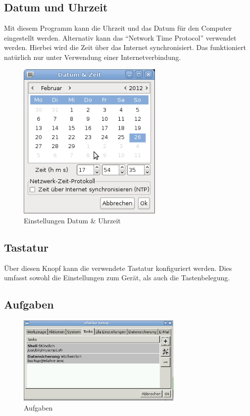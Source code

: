 \documentclass[a4paper,12pt,twoside]{article}
\begin{document}
\subsection{Datum und Uhrzeit}
\label{sct:datetime}
Mit diesem Programm kann die Uhrzeit und das Datum für den Computer
eingestellt werden. Alternativ kann das "`Network Time
Protocol"' verwendet werden. Hierbei wird die Zeit über
das Internet synchronisiert. Das funktioniert natürlich nur unter
Verwendung einer Internetverbindung.

\begin{figure}
    \centering
    \includegraphics[width=7cm]{screenshots/efaLivede-img25.png}
    \caption{Einstellungen Datum \& Uhrzeit}
    \label{fig:datetime}
\end{figure}


\subsection{Tastatur}
\label{sct:tastatur}
Über diesen Knopf kann die verwendete Tastatur konfiguriert werden. Dies
umfasst sowohl die Einstellungen zum Gerät, als auch die
Tastenbelegung.


\subsection{Aufgaben}
\label{sct:efalivesetup_tasks}

\begin{figure}
    \centering
    \includegraphics[width=8cm]{screenshots/efalive_setup_tasks.png}
    \caption{Aufgaben}
    \label{fig:efalivesetup_tasks}
\end{figure}
\end{document}
